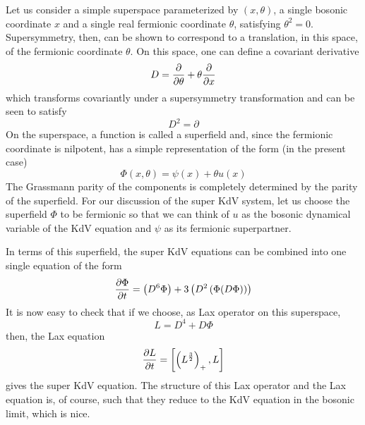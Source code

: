 \documentclass[a4paper,11pt]{article}
\begin{document}
Let us consider a simple superspace parameterized by $(x,\theta)$, a
single bosonic coordinate $x$ and a single real fermionic coordinate
$\theta$, satisfying $\theta^{2} =0$. Supersymmetry, then, can be
shown to correspond to a translation, in this space, of the fermionic
coordinate  $\theta$. On this space, one can define a covariant
derivative
\begin{equation}
D = {\partial\over \partial \theta} + \theta {\partial\over \partial
x}
\end{equation}
which transforms covariantly under a supersymmetry transformation and
can be seen to satisfy
\begin{equation}
D^{2} = \partial
\end{equation}
On the superspace, a function is called a superfield and, since the
fermionic coordinate is nilpotent, has a simple representation of the
form (in the present case)
\begin{equation}
\Phi (x,\theta) = \psi (x) + \theta u(x)
\end{equation}
The Grassmann parity of the components is completely determined by the
parity of the superfield. For our discussion of the super KdV system,
let us choose the superfield $\Phi$ to be fermionic so that we can
think of $u$ as the bosonic dynamical variable of the KdV equation and
$\psi$ as its fermionic superpartner.

In terms of this superfield, the super KdV equations can be combined
into one single equation of the form
\begin{equation}
{\partial \Phi\over \partial t} = \left(D^{6}\Phi\right) + 3
\left(D^{2}\left(\Phi (D\Phi)\right)\right)
\end{equation}
It is now easy to check that if we choose, as Lax operator on this
superspace,
\begin{equation}
L = D^{4} + D \Phi
\end{equation}
then, the Lax equation
\begin{equation}
{\partial L\over \partial t} = \left[ \left(L^{3\over 2}\right)_{+} ,
L\right]
\end{equation}
gives the super KdV equation. The structure of this Lax operator and
the Lax equation is, of course, such that they reduce to the KdV
equation in the bosonic limit, which is nice.
\end{document}

